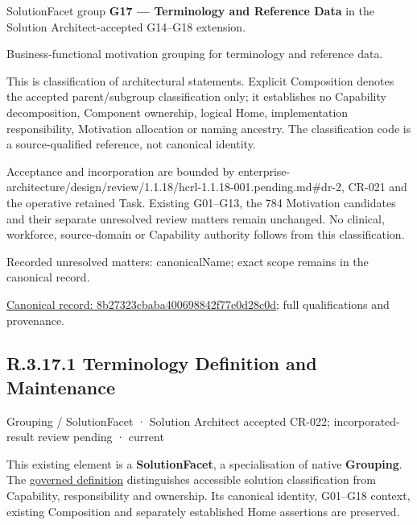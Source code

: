 SolutionFacet group \textbf{G17 — Terminology and Reference Data} in the Solution Architect-accepted G14–G18 extension.



Business-functional motivation grouping for terminology and reference data.



This is classification of architectural statements. Explicit Composition denotes the accepted parent/subgroup classification only; it establishes no Capability decomposition, Component ownership, logical Home, implementation responsibility, Motivation allocation or naming ancestry. The classification code is a source-qualified reference, not canonical identity.



Acceptance and incorporation are bounded by enterprise-architecture/design/review/1.1.18/hcrl-1.1.18-001.pending.md\#dr-2, CR-021 and the operative retained Task. Existing G01–G13, the 784 Motivation candidates and their separate unresolved review matters remain unchanged. No clinical, workforce, source-domain or Capability authority follows from this classification.


{\small Recorded unresolved matters: canonicalName; exact scope remains in the canonical record.}\par
{\footnotesize \href{../../../../../../../continuum/grouping/8b27323cbaba400698842f77e0d28c0d.md}{Canonical record: 8b27323cbaba400698842f77e0d28c0d}; full qualifications and provenance.}\par
\subsection*{R.3.17.1 Terminology Definition and Maintenance}
\label{navigation:R.3.17.1}

\label{element:b83d63bb553c4642b26bbc41f66445b3}
{\small Grouping / SolutionFacet · Solution Architect accepted CR-022; incorporated-result review pending · current}\par

This existing element is a \textbf{SolutionFacet}, a specialisation of native
\textbf{Grouping}. The \href{\detokenize{../../../../../../../governance/continuum-representation.md#solutionfacet-classification--1119-candidate}}{governed definition}
distinguishes accessible solution classification from Capability, responsibility
and ownership. Its canonical identity, G01–G18 context, existing Composition
and separately established Home assertions are preserved.



